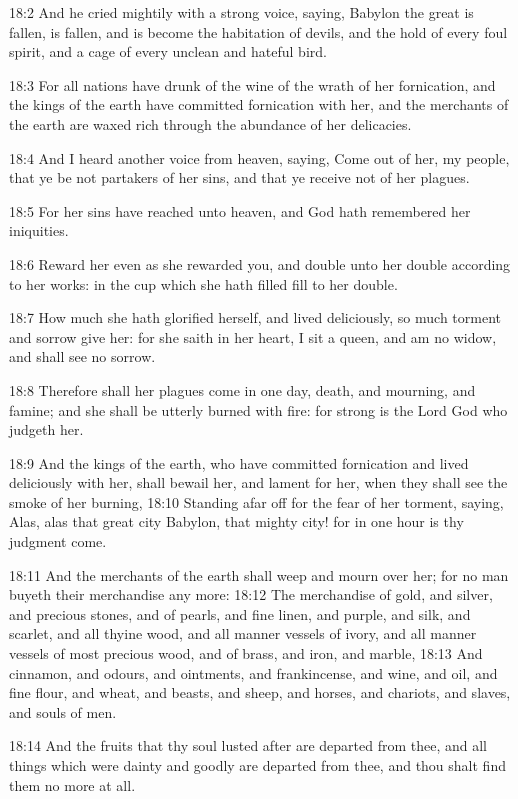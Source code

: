 18:2 And he cried mightily with a strong voice, saying, Babylon the great is fallen, is fallen, and is become the habitation of devils, and the hold of every foul spirit, and a cage of every unclean and hateful bird.

18:3 For all nations have drunk of the wine of the wrath of her fornication, and the kings of the earth have committed fornication with her, and the merchants of the earth are waxed rich through the abundance of her delicacies.

18:4 And I heard another voice from heaven, saying, Come out of her, my people, that ye be not partakers of her sins, and that ye receive not of her plagues.

18:5 For her sins have reached unto heaven, and God hath remembered her iniquities.

18:6 Reward her even as she rewarded you, and double unto her double according to her works: in the cup which she hath filled fill to her double.

18:7 How much she hath glorified herself, and lived deliciously, so much torment and sorrow give her: for she saith in her heart, I sit a queen, and am no widow, and shall see no sorrow.

18:8 Therefore shall her plagues come in one day, death, and mourning, and famine; and she shall be utterly burned with fire: for strong is the Lord God who judgeth her.

18:9 And the kings of the earth, who have committed fornication and lived deliciously with her, shall bewail her, and lament for her, when they shall see the smoke of her burning, 18:10 Standing afar off for the fear of her torment, saying, Alas, alas that great city Babylon, that mighty city! for in one hour is thy judgment come.

18:11 And the merchants of the earth shall weep and mourn over her; for no man buyeth their merchandise any more: 18:12 The merchandise of gold, and silver, and precious stones, and of pearls, and fine linen, and purple, and silk, and scarlet, and all thyine wood, and all manner vessels of ivory, and all manner vessels of most precious wood, and of brass, and iron, and marble, 18:13 And cinnamon, and odours, and ointments, and frankincense, and wine, and oil, and fine flour, and wheat, and beasts, and sheep, and horses, and chariots, and slaves, and souls of men.

18:14 And the fruits that thy soul lusted after are departed from thee, and all things which were dainty and goodly are departed from thee, and thou shalt find them no more at all.

